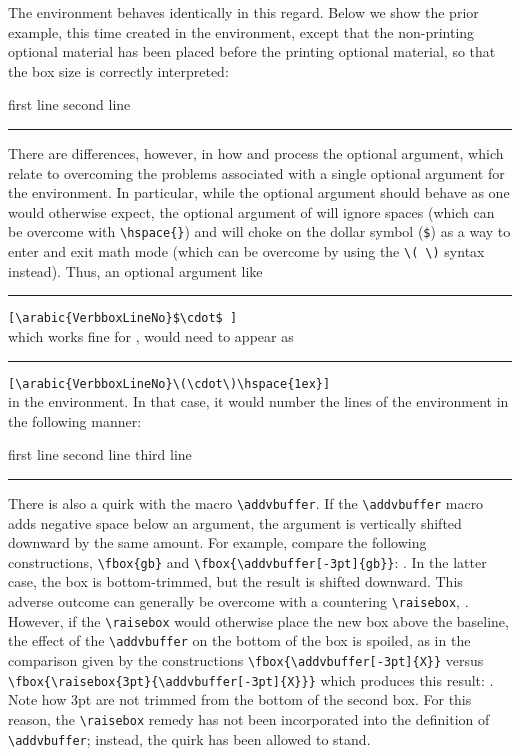 \documentclass{article}
\newcommand\rl{\rule{1em}{0in}}
\begin{document}
\begin{myverbbox}{\myvb}
The {\myvrbox} environment behaves identically in this regard.  Below we
show the prior example, this time created in the {\myvrbox} environment,
except that the non-printing optional material has been placed before
the printing optional material, so that the box size is correctly
interpreted:

\begin{myverbbox}{\mybox}
first line
second line
\end{myverbbox}
\rl\fbox{\mybox}

There are differences, however, in how {\vrbox} and {\myvrbox} process
the optional argument, which relate to overcoming the problems
associated with a single optional argument for the {\vrbox} environment.
In particular, while the {\myvrbox} optional argument should behave as
one would otherwise expect, the optional argument of {\vrbox} will
ignore spaces (which can be overcome with \verb|\hspace{}|) and will
choke on the dollar symbol (\verb|$|) as a way to enter and exit math 
mode (which can be overcome by using the \verb|\(|\ \verb|\)| syntax 
instead).  Thus, an optional argument like\\
  \rl\verb|[\arabic{VerbboxLineNo}$\cdot$ ]|\\
which works fine for \myvrbox,  would need to appear as\\
  \rl\verb|[\arabic{VerbboxLineNo}\(\cdot\)\hspace{1ex}]|\\
in the {\vrbox} environment.  In that case, it would number the lines of
the environment in the following manner:

\begin{verbbox}
first line
second line
third line
\end{verbbox}
\rl\theverbbox

There is also a quirk with the macro \verb|\addvbuffer|.
If the \verb|\addvbuffer| macro adds negative space below an argument, 
the argument is
vertically shifted downward by the same amount.  For example,
compare the following constructions, 
\verb|\fbox{gb}| and \verb|\fbox{\addvbuffer[-3pt]{gb}}|:
.
In the latter case, the box is bottom-trimmed, but the result is shifted downward.  
This adverse outcome can generally be overcome with a countering 
\verb|\raisebox|,
.
However, if the \verb|\raisebox| would otherwise place
the new box above the baseline, the effect of the 
\verb|\addvbuffer| on the bottom of the box is spoiled, as in the 
comparison given by the constructions
\verb|\fbox{\addvbuffer[-3pt]{X}}| versus 
\verb|\fbox{\raisebox{3pt}{\addvbuffer[-3pt]{X}}}|
which produces this result: 
.
Note how 3pt are not trimmed from the bottom of the second box.
For this reason, the \verb|\raisebox| remedy has not been incorporated into the definition
of \verb|\addvbuffer|; instead, the quirk has been allowed to stand.



\end{myverbbox}
\end{document}
